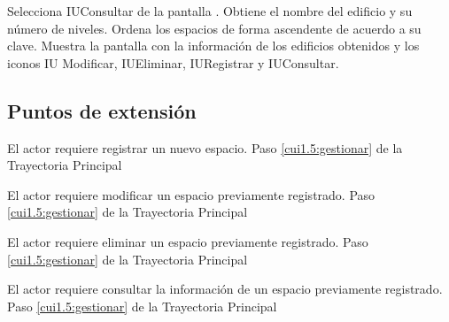 \begin{UCtrayectoria}
	
	\UCpaso [\UCactor] Selecciona IUConsultar de la pantalla . %
	\UCpaso [\UCsist] Obtiene el nombre del edificio y su número de niveles.
	\UCpaso [\UCsist] Ordena los espacios de forma ascendente de acuerdo a su clave.
	\UCpaso[\UCsist] Muestra la pantalla  con la información de los edificios obtenidos y los iconos IU Modificar, IUEliminar, IURegistrar y IUConsultar. 
	\label{cui1.5:gestionar}
\end{UCtrayectoria}

\subsection{Puntos de extensión}

\UCExtensionPoint 
{El actor requiere registrar un nuevo espacio.}
{Paso \ref{cui1.5:gestionar} de la Trayectoria Principal}
{}

\UCExtensionPoint 
{El actor requiere modificar un espacio previamente registrado.}
{Paso \ref{cui1.5:gestionar} de la Trayectoria Principal}
{}

\UCExtensionPoint 
{El actor requiere eliminar un espacio previamente registrado.}
{Paso \ref{cui1.5:gestionar} de la Trayectoria Principal}
{}

\UCExtensionPoint 
{El actor requiere consultar la información de un espacio previamente registrado.}
{Paso \ref{cui1.5:gestionar} de la Trayectoria Principal}
{}


